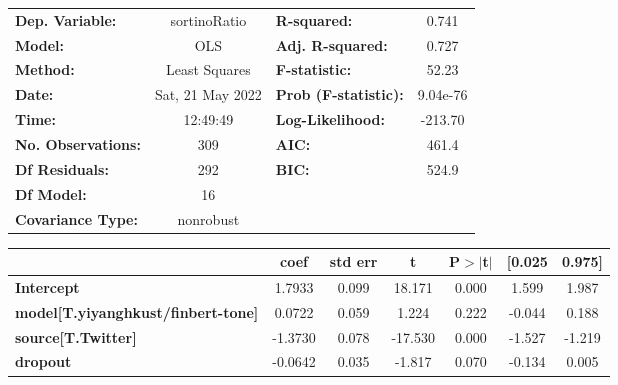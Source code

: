 \begin{center}
\begin{tabular}{lclc}
\toprule
\textbf{Dep. Variable:}                    &   sortinoRatio   & \textbf{  R-squared:         } &     0.741   \\
\textbf{Model:}                            &       OLS        & \textbf{  Adj. R-squared:    } &     0.727   \\
\textbf{Method:}                           &  Least Squares   & \textbf{  F-statistic:       } &     52.23   \\
\textbf{Date:}                             & Sat, 21 May 2022 & \textbf{  Prob (F-statistic):} &  9.04e-76   \\
\textbf{Time:}                             &     12:49:49     & \textbf{  Log-Likelihood:    } &   -213.70   \\
\textbf{No. Observations:}                 &         309      & \textbf{  AIC:               } &     461.4   \\
\textbf{Df Residuals:}                     &         292      & \textbf{  BIC:               } &     524.9   \\
\textbf{Df Model:}                         &          16      & \textbf{                     } &             \\
\textbf{Covariance Type:}                  &    nonrobust     & \textbf{                     } &             \\
\bottomrule
\end{tabular}
\begin{tabular}{lcccccc}
                                           & \textbf{coef} & \textbf{std err} & \textbf{t} & \textbf{P$> |$t$|$} & \textbf{[0.025} & \textbf{0.975]}  \\
\midrule
\textbf{Intercept}                         &       1.7933  &        0.099     &    18.171  &         0.000        &        1.599    &        1.987     \\
\textbf{model[T.yiyanghkust/finbert-tone]} &       0.0722  &        0.059     &     1.224  &         0.222        &       -0.044    &        0.188     \\
\textbf{source[T.Twitter]}                 &      -1.3730  &        0.078     &   -17.530  &         0.000        &       -1.527    &       -1.219     \\
\textbf{dropout}                           &      -0.0642  &        0.035     &    -1.817  &         0.070        &       -0.134    &        0.005     \\

\end{tabular}
\end{center}
